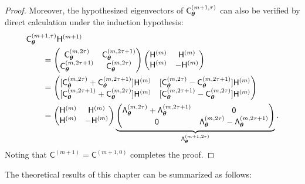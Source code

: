 \documentclass[graybox,footinfo]{svmult}
\begin{document}
\begin{proof}
    Moreover, the hypothesized eigenvectors of $\mathsf{C}_{{\boldsymbol{\theta}}}^{(m+1,\tau)}$ can also be verified by direct calculation under the induction hypothesis:
     \begin{align*}
        \MoveEqLeft{\mathsf{C}_{\bstheta}^{(m+1,\tau)} \mathsf{H}^{(m+1)}} \\
        & =  
        \begin{pmatrix} \mathsf{C}_{\bstheta}^{(m,2 \tau)} & \mathsf{C}_{\bstheta}^{(m,2 \tau+1)} \\
        \mathsf{C}_{\bstheta}^{(m,2 \tau+1)} & \mathsf{C}_{\bstheta}^{(m,2 \tau)}
        \end{pmatrix} 
        \begin{pmatrix}
        \mathsf{H}^{(m)} &   \mathsf{H}^{(m)} \\
         \mathsf{H}^{(m)} & - \mathsf{H}^{(m)}
        \end{pmatrix}\\
        & = 
    \begin{pmatrix}
        [\mathsf{C}_{\bstheta}^{(m,2\tau)} + \mathsf{C}_{\bstheta}^{(m,2\tau+1)}] \mathsf{H}^{(m)} & [\mathsf{C}_{\bstheta}^{(m,2\tau)} - \mathsf{C}_{\bstheta}^{(m,2\tau+1)}] \mathsf{H}^{(m)}\\
        [\mathsf{C}_{\bstheta}^{(m,2\tau+1)} + \mathsf{C}_{\bstheta}^{(m,2\tau)}] \mathsf{H}^{(m)} &   [\mathsf{C}_{\bstheta}^{(m,2\tau+1)} - \mathsf{C}_{\bstheta}^{(m,2\tau)}] \mathsf{H}^{(m)}
        \end{pmatrix} \\
        & = \begin{pmatrix}
        \mathsf{H}^{(m)} & \mathsf{H}^{(m)} \\ \mathsf{H}^{(m)} & -\mathsf{H}^{(m)}
        \end{pmatrix} 
        \underbrace{\begin{pmatrix}
        \mathsf{\Lambda}_\bstheta^{(m,2\tau)} + \mathsf{\Lambda}_\bstheta^{(m,2\tau+1)}  & \mathsf{0}\\
        \mathsf{0} &   \mathsf{\Lambda}_\bstheta^{(m,2\tau)} - \mathsf{\Lambda}_\bstheta^{(m,2\tau+1)}
        \end{pmatrix}}_{\mathsf{\Lambda}_\bstheta^{(m+1,2\tau)}} 
        .
    \end{align*}
Noting that $\mathsf{C}^{(m+1)} = \mathsf{C}^{(m+1,0)} $ completes the proof.
\end{proof}


The theoretical results of this chapter can be summarized as follows:
\end{document}
